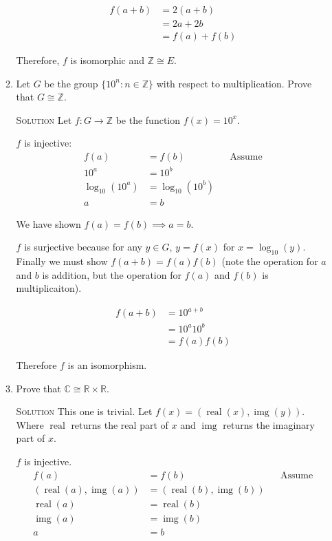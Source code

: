 \documentclass[twoside]{amsart}
\newcommand{\solution}{\textsc{Solution}\xspace}
\newcommand{\iso}{\cong}
\newcommand{\blank}{\vspace{5pt}}
\newcommand{\real}{\mathop{\mathrm{real}}}
\newcommand{\img}{\mathop{\mathrm{img}}}
\begin{document}
\begin{enumerate}[A.]
\begin{enumerate}[1]
      \setcounter{equation}{0}
      \begin{align}
         f(a+b) &= 2(a+b) \\
                &= 2a + 2b \\
                &= f(a) + f(b)
      \end{align}

      Therefore, $f$ is isomorphic and $\mathbb{Z} \iso E$.
      \blank
      \item Let $G$ be the group $\{10^n : n \in \mathbb{Z}\}$ with respect
      to multiplication. Prove that $G \iso \mathbb{Z}$.

      \blank \noindent \solution Let $f : G \to \mathbb{Z}$ be the function
      $f(x) = 10^x$.

      $f$ is injective:
      \begin{align*}
         f(a) &= f(b) && \text{Assume} \\
         10^a &= 10^b  \\ 
         \log_{10}(10^a) &= \log_{10}(10^b) \\
            a &= b
      \end{align*}

      We have shown $f(a)=f(b) \implies a = b$.

      $f$ is surjective because for any $y \in G$, $ y= f(x)$ for
      $x = \log_{10}(y)$. Finally we must show $f(a+b)=f(a)f(b)$ (note
      the operation for $a$ and $b$ is addition, but the operation for
      $f(a)$ and $f(b)$ is multiplicaiton).

      \begin{align*}
         f(a+b) &= 10^{a+b} \\
                &= 10^a 10^b \\
                &= f(a)f(b)
      \end{align*}

      Therefore $f$ is an isomorphism.
      
      \blank 
      \item Prove that $\mathbb{C} \iso \mathbb{R} \times \mathbb{R}$.

      \blank \noindent \solution  This one is trivial. 
      Let $f(x) = (\real(x),\img(y))$. Where $\real$ returns the real 
      part of $x$ and $\img$ returns the imaginary part of $x$.

      $f$ is injective.
      \begin{align*}
         f(a) &= f(b)  && \text{Assume} \\
         (\real(a),\img(a)) &= (\real(b),\img(b)) \\
          \real(a) &= \real(b) \\
          \img(a) &= \img(b)  \\
          a &= b
      \end{align*}


\end{enumerate}
\end{enumerate}
\end{document}
